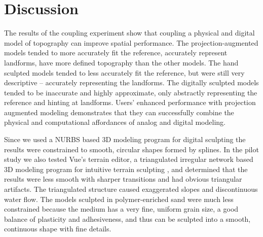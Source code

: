 \documentclass[prodmode,acmtochi]{acmsmall} %
\begin{document}
%
%

\section{Discussion}
The results of the coupling experiment show that 
coupling a physical and digital model of topography 
can improve spatial performance. 
%
The projection-augmented models tended
to more accurately fit the reference, 
accurately represent landforms, 
have more defined topography
than the other models. 
%
The hand sculpted models tended
to less accurately fit the reference, but
were still very descriptive 
-- accurately representing the landforms. 
%
The digitally sculpted models tended
to be inaccurate and highly approximate,
only abstractly representing the reference
and hinting at landforms. 
%
Users' enhanced performance with projection augmented modeling 
demonstrates that they can successfully 
combine the physical and computational affordances 
of analog and digital modeling. 

Since we used a NURBS based 3D modeling program 
for digital sculpting
the results were constrained to smooth, circular shapes %
formed by splines.
%
In the pilot study we also tested Vue's terrain editor,
a triangulated irregular network based 3D modeling program 
for intuitive terrain sculpting \cite{Vue},
and determined that the results were 
less smooth with sharper transitions and
had obvious triangular artifacts.
The triangulated structure caused
exaggerated slopes and discontinuous water flow. 
%
The models sculpted in polymer-enriched sand 
were much less constrained 
because the medium has a very fine, uniform grain size,
a good balance of plasticity and adhesiveness,
and thus can be sculpted into a smooth, continuous shape
with fine details.
\end{document}
